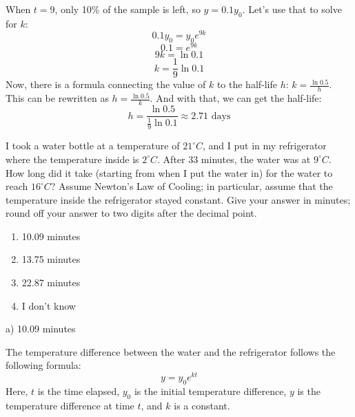 \documentclass[addpoints,12pt,answers]{exam}
\begin{document}
\begin{questions}
\begin{solution}
    When $t=9$, only 10\% of the sample is left, so $y=0.1y_0$. Let's use that to solve for $k$:
    $$0.1y_0=y_0e^{9k}$$
    $$0.1=e^{9k}$$
    $$9k=\ln 0.1$$
    $$k=\frac{1}{9}\ln 0.1$$
    Now, there is a formula connecting the value of $k$ to the half-life $h$: $\displaystyle k=\frac{\ln 0.5}{h}$. This can be rewritten as $\displaystyle h=\frac{\ln 0.5}{k}$. And with that, we can get the half-life:
    $$h=\frac{\ln 0.5}{\frac{1}{9}\ln 0.1}\approx 2.71\text{ days}$$
  \end{solution}
  \newpage
  \question
  I took a water bottle at a temperature of $21^\circ C$, and I put in my refrigerator where the temperature inside is $2^\circ C$. After 33 minutes, the water was at $9^\circ C$. How long did it take (starting from when I put the water in) for the water to reach $16^\circ C$? Assume Newton's Law of Cooling; in particular, assume that the temperature inside the refrigerator stayed constant. Give your answer in minutes; round off your answer to two digits after the decimal point.
  \begin{enumerate}[label=\alph*)]
    \item
    10.09 minutes
    \item
    13.75 minutes
    \item
    22.87 minutes
    \item
    I don't know
  \end{enumerate}
  \begin{solution}
    a) 10.09 minutes
    
    The temperature difference between the water and the refrigerator follows the following formula:
    $$y=y_0e^{kt}$$
    Here, $t$ is the time elapsed, $y_0$ is the initial temperature difference, $y$ is the temperature difference at time $t$, and $k$ is a constant.
    

\end{solution}
\end{questions}
\end{document}
